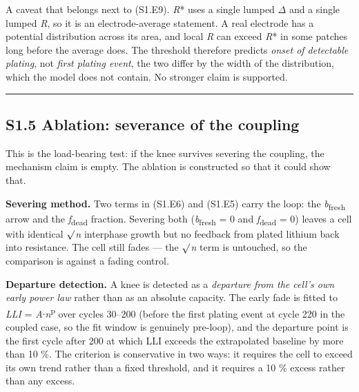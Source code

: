 \documentclass[11pt,a4paper]{article}
\begin{document}
A caveat that belongs next to (S1.E9). \emph{R}* uses a single lumped \ensuremath{\Delta} and a single lumped \emph{R}, so it is an electrode-average statement. A real electrode has a potential distribution across its area, and local \emph{R} can exceed \emph{R}* in some patches long before the average does. The threshold therefore predicts \emph{onset of detectable plating}, not \emph{first plating event}, the two differ by the width of the distribution, which the model does not contain. No stronger claim is supported.


\par\noindent\rule{\linewidth}{0.4pt}\par


\subsection*{S1.5 Ablation: severance of the coupling}


This is the load-bearing test: if the knee survives severing the coupling, the mechanism claim is empty. The ablation is constructed so that it could show that.


\textbf{Severing method.} Two terms in (S1.E6) and (S1.E5) carry the loop: the \emph{b}\textsubscript{fresh} arrow and the \emph{f}\textsubscript{dead} fraction. Severing both (\emph{b}\textsubscript{fresh} = 0 and \emph{f}\textsubscript{dead} = 0) leaves a cell with identical \ensuremath{\surd}\emph{n} interphase growth but no feedback from plated lithium back into resistance. The cell still fades --- the \ensuremath{\surd}\emph{n} term is untouched, so the comparison is against a fading control.


\textbf{Departure detection.} A knee is detected as a \emph{departure from the cell's own early power law} rather than as an absolute capacity. The early fade is fitted to \emph{LLI} = \emph{A}\ensuremath{\cdot}\emph{n}\textsuperscript{p} over cycles 30--200 (before the first plating event at cycle 220 in the coupled case, so the fit window is genuinely pre-loop), and the departure point is the first cycle after 200 at which LLI exceeds the extrapolated baseline by more than 10 \%. The criterion is conservative in two ways: it requires the cell to exceed its own trend rather than a fixed threshold, and it requires a 10 \% excess rather than any excess.
\end{document}
